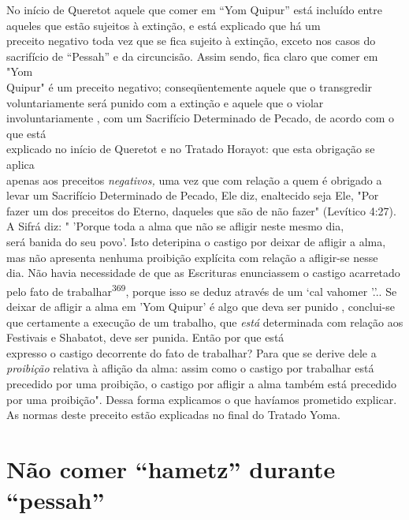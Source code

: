 No início de Queretot aquele que comer em ``Yom Quipur'' está incluído
entre aqueles que estão sujeitos à extinção, e está explicado que
há um\\
preceito negativo toda vez que se fica sujeito à extinção, exceto nos
casos do sacrifício
de ``Pessah'' e da circuncisão. Assim sendo, fica claro que comer
em "Yom\\
Quipur" é um preceito negativo; conseqüentemente aquele que o
transgredir\\
voluntariamente será punido com a extinção e aquele que o violar
involuntariamente
, com um Sacrifício Determinado de Pecado, de acordo com o que
está\\
explicado no início de Queretot e no Tratado Horayot: que esta obrigação
se aplica\\
apenas aos preceitos \emph{negativos,} uma vez que com relação a quem é
obrigado a\\
levar um Sacrifício Determinado de Pecado, Ele diz, enaltecido seja Ele,
"Por fazer
um dos preceitos do Eterno, daqueles que são de não fazer" (Levítico
4:27).\\
A Sifrá diz: " 'Porque toda a alma que não se afligir neste mesmo dia,\\
será banida do seu povo'. Isto deteripina o castigo por deixar de
afligir a alma,\\
mas não apresenta nenhuma proibição explícita com relação a afligir-se
nesse\\
dia. Não havia necessidade de que as Escrituras enunciassem o castigo
acarretado
pelo fato de trabalhar\textsuperscript{369}, porque isso se deduz
através de um `cal vahomer
'.'.. Se deixar de afligir a alma
em 'Yom Quipur' é algo que deva ser punido
, conclui-se que certamente a execução de um trabalho, que \emph{está}
determinada
com relação aos Festivais e Shabatot, deve ser punida. Então por que
está\\
expresso o castigo decorrente do fato de trabalhar? Para que se derive
dele a\\
\emph{proibição} relativa à aflição da alma: assim como o castigo por
trabalhar está precedido
por uma proibição, o castigo por afligir a alma também está
precedido\\
por uma proibição". Dessa forma explicamos o que havíamos prometido
explicar.\\
As normas deste preceito estão explicadas no final do Tratado Yoma.


\section{Não comer ``hametz'' durante ``pessah''}

